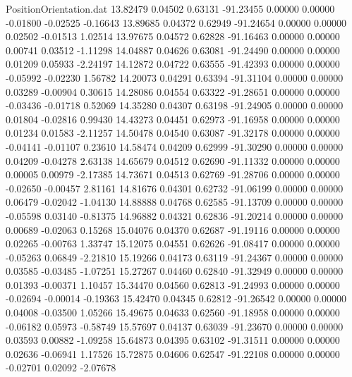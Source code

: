 \begin{filecontents}{PositionOrientation.dat}
  13.82479    0.04502    0.63131   -91.23455    0.00000    0.00000   -0.01800   -0.02525   -0.16643
  13.89685    0.04372    0.62949   -91.24654    0.00000    0.00000    0.02502   -0.01513    1.02514
  13.97675    0.04572    0.62828   -91.16463    0.00000    0.00000    0.00741    0.03512   -1.11298
  14.04887    0.04626    0.63081   -91.24490    0.00000    0.00000    0.01209    0.05933   -2.24197
  14.12872    0.04722    0.63555   -91.42393    0.00000    0.00000   -0.05992   -0.02230    1.56782
  14.20073    0.04291    0.63394   -91.31104    0.00000    0.00000    0.03289   -0.00904    0.30615
  14.28086    0.04554    0.63322   -91.28651    0.00000    0.00000   -0.03436   -0.01718    0.52069
  14.35280    0.04307    0.63198   -91.24905    0.00000    0.00000    0.01804   -0.02816    0.99430
  14.43273    0.04451    0.62973   -91.16958    0.00000    0.00000    0.01234    0.01583   -2.11257
  14.50478    0.04540    0.63087   -91.32178    0.00000    0.00000   -0.04141   -0.01107    0.23610
  14.58474    0.04209    0.62999   -91.30290    0.00000    0.00000    0.04209   -0.04278    2.63138
  14.65679    0.04512    0.62690   -91.11332    0.00000    0.00000    0.00005    0.00979   -2.17385
  14.73671    0.04513    0.62769   -91.28706    0.00000    0.00000   -0.02650   -0.00457    2.81161
  14.81676    0.04301    0.62732   -91.06199    0.00000    0.00000    0.06479   -0.02042   -1.04130
  14.88888    0.04768    0.62585   -91.13709    0.00000    0.00000   -0.05598    0.03140   -0.81375
  14.96882    0.04321    0.62836   -91.20214    0.00000    0.00000    0.00689   -0.02063    0.15268
  15.04076    0.04370    0.62687   -91.19116    0.00000    0.00000    0.02265   -0.00763    1.33747
  15.12075    0.04551    0.62626   -91.08417    0.00000    0.00000   -0.05263    0.06849   -2.21810
  15.19266    0.04173    0.63119   -91.24367    0.00000    0.00000    0.03585   -0.03485   -1.07251
  15.27267    0.04460    0.62840   -91.32949    0.00000    0.00000    0.01393   -0.00371    1.10457
  15.34470    0.04560    0.62813   -91.24993    0.00000    0.00000   -0.02694   -0.00014   -0.19363
  15.42470    0.04345    0.62812   -91.26542    0.00000    0.00000    0.04008   -0.03500    1.05266
  15.49675    0.04633    0.62560   -91.18958    0.00000    0.00000   -0.06182    0.05973   -0.58749
  15.57697    0.04137    0.63039   -91.23670    0.00000    0.00000    0.03593    0.00882   -1.09258
  15.64873    0.04395    0.63102   -91.31511    0.00000    0.00000    0.02636   -0.06941    1.17526
  15.72875    0.04606    0.62547   -91.22108    0.00000    0.00000   -0.02701    0.02092   -2.07678

\end{filecontents}
